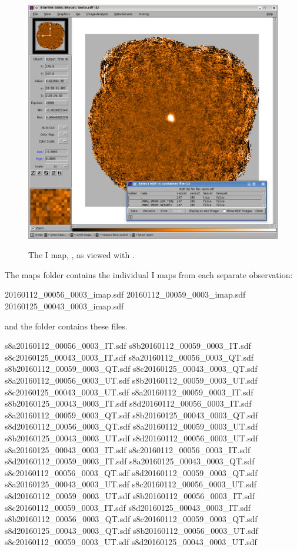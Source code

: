 \begin{figure}[t!]
\begin{center}
\includegraphics[width=0.8\linewidth]{sc22-gaia-view-iauto.png}
\label{fig:gaia-iauto}
\caption [I map in GAIA]{
  \small The I map, , as viewed with \GAIA.
}
\end{center}
\end{figure}

The maps folder contains the individual I maps from each separate
observation:

\begin{terminalv}
20160112_00056_0003_imap.sdf  20160112_00059_0003_imap.sdf  20160125_00043_0003_imap.sdf
\end{terminalv}

and the  folder contains these files.

\begin{terminalv}
s8a20160112_00056_0003_IT.sdf  s8b20160112_00059_0003_IT.sdf  s8c20160125_00043_0003_IT.sdf
s8a20160112_00056_0003_QT.sdf  s8b20160112_00059_0003_QT.sdf  s8c20160125_00043_0003_QT.sdf
s8a20160112_00056_0003_UT.sdf  s8b20160112_00059_0003_UT.sdf  s8c20160125_00043_0003_UT.sdf
s8a20160112_00059_0003_IT.sdf  s8b20160125_00043_0003_IT.sdf  s8d20160112_00056_0003_IT.sdf
s8a20160112_00059_0003_QT.sdf  s8b20160125_00043_0003_QT.sdf  s8d20160112_00056_0003_QT.sdf
s8a20160112_00059_0003_UT.sdf  s8b20160125_00043_0003_UT.sdf  s8d20160112_00056_0003_UT.sdf
s8a20160125_00043_0003_IT.sdf  s8c20160112_00056_0003_IT.sdf  s8d20160112_00059_0003_IT.sdf
s8a20160125_00043_0003_QT.sdf  s8c20160112_00056_0003_QT.sdf  s8d20160112_00059_0003_QT.sdf
s8a20160125_00043_0003_UT.sdf  s8c20160112_00056_0003_UT.sdf  s8d20160112_00059_0003_UT.sdf
s8b20160112_00056_0003_IT.sdf  s8c20160112_00059_0003_IT.sdf  s8d20160125_00043_0003_IT.sdf
s8b20160112_00056_0003_QT.sdf  s8c20160112_00059_0003_QT.sdf  s8d20160125_00043_0003_QT.sdf
s8b20160112_00056_0003_UT.sdf  s8c20160112_00059_0003_UT.sdf  s8d20160125_00043_0003_UT.sdf
\end{terminalv}



